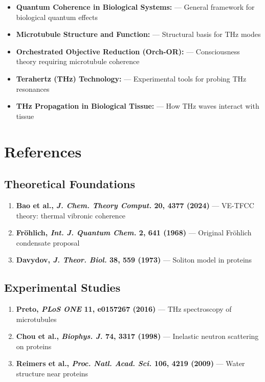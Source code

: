 \begin{itemize}

\item
  \textbf{Quantum Coherence in Biological Systems:} --- General
  framework for biological quantum effects
\item
  \textbf{Microtubule Structure and Function:} --- Structural
  basis for THz modes
\item
  \textbf{Orchestrated Objective Reduction (Orch-OR):} ---
  Consciousness theory requiring microtubule coherence
\item
  \textbf{Terahertz (THz) Technology:} --- Experimental tools for
  probing THz resonances
\item
  \textbf{THz Propagation in Biological Tissue:} --- How THz waves
  interact with tissue
\end{itemize}



\section{References}\label{references}

\subsection{Theoretical Foundations}\label{theoretical-foundations}

\begin{enumerate}
\def\labelenumi{\arabic{enumi}.}

\item
  \textbf{Bao et al., \emph{J. Chem. Theory Comput.} 20, 4377 (2024)}
  --- VE-TFCC theory: thermal vibronic coherence
\item
  \textbf{Fröhlich, \emph{Int. J. Quantum Chem.} 2, 641 (1968)} ---
  Original Fröhlich condensate proposal
\item
  \textbf{Davydov, \emph{J. Theor. Biol.} 38, 559 (1973)} ---
  Soliton model in proteins
\end{enumerate}

\subsection{Experimental Studies}\label{experimental-studies}

\begin{enumerate}
\def\labelenumi{\arabic{enumi}.}
\setcounter{enumi}{3}

\item
  \textbf{Preto, \emph{PLoS ONE} 11, e0157267 (2016)} --- THz
  spectroscopy of microtubules
\item
  \textbf{Chou et al., \emph{Biophys. J.} 74, 3317 (1998)} ---
  Inelastic neutron scattering on proteins
\item
  \textbf{Reimers et al., \emph{Proc. Natl. Acad. Sci.} 106, 4219
  (2009)} --- Water structure near proteins
\end{enumerate}

